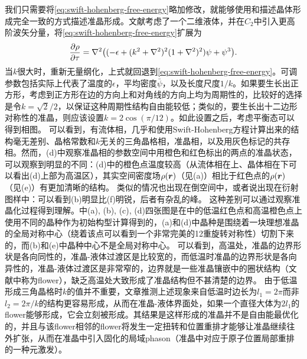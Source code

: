 \documentclass[hyperref, UTF8, a4paper]{ctexart}
\begin{document}
我们只需要将\eqref{eq:swift-hohenberg-free-energy}略加修改，就能够使用和描述晶体形成完全一致的方式描述准晶形成。文献\cite{PhysRevLett.112.255501}考虑了一个二维液体，并在$C_2$中引入更高阶波矢分量，将\eqref{eq:swift-hohenberg-free-energy}扩展为
\begin{equation}
    \pdv{\rho}{\tau} = \laplacian((- \epsilon + (k^2 + \laplacian)^2 (1 + \laplacian)^2) \psi + \psi^3).
    \label{eq:generalized-sh}
\end{equation}
当$k$很大时，重新无量纲化，上式就回退到\eqref{eq:swift-hohenberg-free-energy}。可调参数包括实际上代表了温度的$\epsilon$，平均密度$\bar{\psi}$，以及长度尺度$1 / k$。如果要生长出正方形，考虑到正方形在边的方向上和对角线的方向上均为周期性的，比较好的选择是令$k = \sqrt{2} / 2$，以保证这种周期性结构自由能较低；类似的，要生长出十二边形对称性的准晶，则应该设置$k = 2 \cos(\pi / 12)$。如此设置之后，考虑平衡态可以得到相图。
可以看到，有流体相，几乎和使用Swift-Hohenberg方程计算出来的结构毫无差别、晶格常数和$k$无关的三角晶格相，准晶相，以及用灰色标记的共存相。然而，(d)中观察准晶相的参数空间中用橙色和红色标出的两点的准晶状态，可以观察到明显的不同：(d)中的橙色点温度较高（从流体相在上、晶体相在下可以看出(d)上部为高温区），其实空间密度场$\rho(\vb*{r})$（见(a)）相比于红色点的$\rho(\vb*{r})$（见(e)）有更加清晰的结构。
类似的情况也出现在倒空间中，或者说出现在衍射图样中：可以看到(b)明显比(f)明锐，后者有杂乱的峰。
这种差别可以通过观察准晶化过程得到理解。中(a), (b), (c), (d)四张图是在中的低温红色点和高温橙色点上使用不同的晶种作为初始构型计算得到的，(a)和(d)中晶种是围绕着一块理想准晶的全局对称中心（绕着该点可以看到一个非常完美的12重旋转对称性）切割下来的，而(b)和(e)中晶种中心不是全局对称中心。
可以看到，高温处，准晶的边界形状是各向同性的，准晶-液体过渡区是比较宽的，而低温时准晶的边界形状是各向异性的，准晶-液体过渡区是非常窄的，边界就是一些准晶镶嵌中的圈状结构（文献\cite{PhysRevLett.112.255501}中称为flower），缺乏高温处大致形成了准晶结构但不甚清楚的边界。
由于低温形成三角晶格时$k$的值并不重要，文章推测上述现象来自低温时边长为$l_1 = 2\pi$而非$l_2 = 2\pi / k$的结构更容易形成，从而在准晶-液体界面处，如果一个直径大体为$2l_1$的flower能够形成，它会立刻被形成。其结果是这样形成的准晶并不是自由能最优化的，并且与该flower相邻的flower将发生一定扭转和位置重排才能够让准晶继续往外扩张，从而在准晶中引入固化的局域phason（准晶中对应于原子位置局部重排的一种元激发）。
\end{document}
